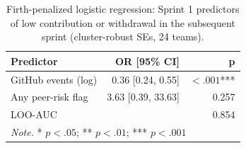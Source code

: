 \begin{table}[ht]
\centering
\scriptsize
\setlength{\tabcolsep}{4pt}
\renewcommand{\arraystretch}{0.88}
\caption{Firth-penalized logistic regression: Sprint 1 predictors of low contribution or withdrawal in the subsequent sprint (cluster-robust SEs, 24 teams).}
\label{tab:firth_s1s3}
\begin{tabular}{l r r}
\toprule
\textbf{Predictor} & \textbf{OR [95\% CI]} & \textbf{p} \\
\midrule
GitHub events (log) & 0.36 [0.24, 0.55] & $< .001$*** \\
Any peer-risk flag & 3.63 [0.39, 33.63] & 0.257 \\
\midrule
LOO-AUC & \multicolumn{2}{r}{0.854} \\
\midrule
\multicolumn{3}{l}{\textit{Note.} * $p < .05$; ** $p < .01$; *** $p < .001$} \\
\bottomrule
\end{tabular}
\end{table}
